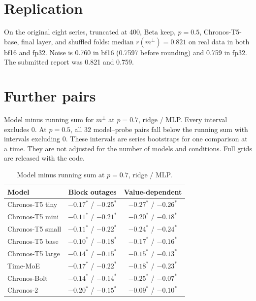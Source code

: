 \documentclass{article}
\newcommand{\mperp}{m^{\perp}}
\begin{document}
\section{Replication}
\label{app:replication}

On the original eight series, truncated at 400, Beta keep, $p = 0.5$, Chronos-T5-base, final layer, and shuffled folds: median $r(\mperp) = 0.821$ on real data in both bf16 and fp32.
Noise is 0.760 in bf16 (0.7597 before rounding) and 0.759 in fp32.
The submitted report was 0.821 and 0.759.

\section{Further pairs}
\label{app:pairs}

Model minus running sum for $\mperp$ at $p = 0.7$, ridge / MLP.
Every interval excludes 0.
At $p = 0.5$, all 32 model--probe pairs fall below the running sum with intervals excluding 0.
These intervals are series bootstraps for one comparison at a time.
They are not adjusted for the number of models and conditions.
Full grids are released with the code.

\begin{table}[h]
  \caption{Model minus running sum at $p = 0.7$, ridge / MLP.}
  \label{tab:appc}
  \centering
  \small
  \begin{tabular}{lcc}
    \toprule
    Model & Block outages & Value-dependent \\
    \midrule
    Chronos-T5 tiny & $-0.17^{\ast}$ / $-0.25^{\ast}$ & $-0.27^{\ast}$ / $-0.26^{\ast}$ \\
    Chronos-T5 mini & $-0.11^{\ast}$ / $-0.21^{\ast}$ & $-0.20^{\ast}$ / $-0.18^{\ast}$ \\
    Chronos-T5 small & $-0.11^{\ast}$ / $-0.22^{\ast}$ & $-0.24^{\ast}$ / $-0.24^{\ast}$ \\
    Chronos-T5 base & $-0.10^{\ast}$ / $-0.18^{\ast}$ & $-0.17^{\ast}$ / $-0.16^{\ast}$ \\
    Chronos-T5 large & $-0.14^{\ast}$ / $-0.15^{\ast}$ & $-0.15^{\ast}$ / $-0.13^{\ast}$ \\
    Time-MoE & $-0.17^{\ast}$ / $-0.22^{\ast}$ & $-0.18^{\ast}$ / $-0.23^{\ast}$ \\
    Chronos-Bolt & $-0.14^{\ast}$ / $-0.14^{\ast}$ & $-0.25^{\ast}$ / $-0.07^{\ast}$ \\
    Chronos-2 & $-0.20^{\ast}$ / $-0.15^{\ast}$ & $-0.09^{\ast}$ / $-0.10^{\ast}$ \\
    \bottomrule
  \end{tabular}
\end{table}


\end{document}

